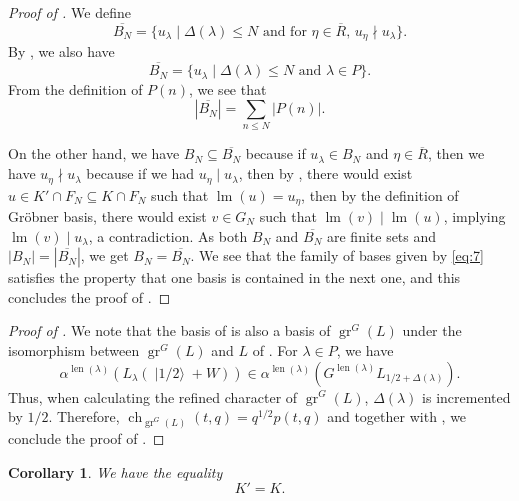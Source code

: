 \documentclass[a4paper, 12pt, reqno]{amsart}
\newtheorem{corollary}[theorem]{Corollary}
\theoremstyle{remark}
\DeclareMathOperator{\gr}{gr}
\DeclareMathOperator{\ch}{ch}
\DeclareMathOperator{\lm}{lm}
\DeclareMathOperator{\len}{len}
\DeclareMathOperator{\vachalf}{|1/2\rangle}
\begin{document}
\begin{proof}[Proof of ]
  We define
  \begin{equation*}
    \overline{B_N} = \{u_{\lambda} \mid \text{$\Delta(\lambda) \le N$ and for $\eta \in \overline{R}$, $u_{\eta} \nmid u_{\lambda}$}\}.
  \end{equation*}
  By , we also have
  \begin{equation*}
    \overline{B_N} = \{u_{\lambda} \mid \text{$\Delta(\lambda) \le N$ and $\lambda \in P$}\}.
  \end{equation*}
  From the definition of $P(n)$, we see that
  \begin{equation*}
    |\overline{B_N}| = \sum_{n \le N}|P(n)|.
  \end{equation*}

  On the other hand, we have $B_N \subseteq \overline{B_N}$ because if $u_{\lambda} \in B_N$ and $\eta \in \overline{R}$, then we have $u_{\eta} \nmid u_{\lambda}$ because if we had $u_{\eta} \mid u_{\lambda}$, then by , there would exist $u \in K' \cap F_N \subseteq K \cap F_N$ such that $\lm(u) = u_{\eta}$, then by the definition of Gröbner basis, there would exist $v \in G_N$ such that $\lm(v) \mid \lm(u)$, implying $\lm(v) \mid u_{\lambda}$, a contradiction.
  As both $B_N$ and $\overline{B_N}$ are finite sets and $|B_N| = |\overline{B_N}|$, we get $B_N = \overline{B_N}$.
  We see that the family of bases given by \eqref{eq:7} satisfies the property that one basis is contained in the next one, and this concludes the proof of .
\end{proof}

\begin{proof}[Proof of ]
  We note that the basis of  is also a basis of $\gr^G(L)$ under the isomorphism between $\gr^G(L)$ and $L$ of .
  For $\lambda \in P$, we have
  \begin{equation*}
    \alpha^{\len(\lambda)}(L_{\lambda}(\vachalf + W)) \in \alpha^{\len(\lambda)}(G^{\len(\lambda)}L_{1/2 + \Delta(\lambda)}).
  \end{equation*}
  Thus, when calculating the refined character of $\gr^G(L)$, $\Delta(\lambda)$ is incremented by $1/2$.
  Therefore, $\ch_{\gr^G(L)}(t, q) = q^{1/2}p(t, q)$ and together with , we conclude the proof of .
\end{proof}

\begin{corollary}
  \label{crl:1}
  We have the equality
  \begin{equation*}
    K' = K.
  \end{equation*}
\end{corollary}
\end{document}
